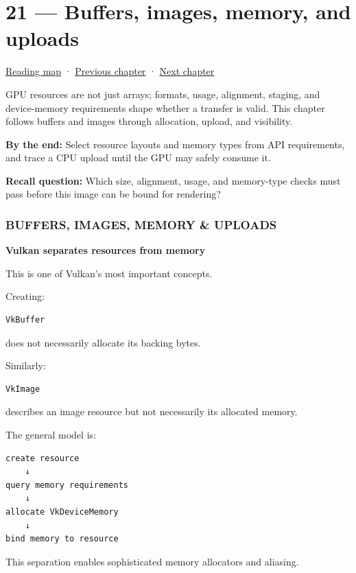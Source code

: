\hypertarget{05-engine-i-ch021}{}
\chapter{21 --- Buffers, images, memory, and uploads}\label{05-engine-i-ch021-buffers-images-memory-and-uploads}

\hyperref[volume-reading-map]{Reading map} · \hyperref[05-engine-i-ch020]{Previous chapter} · \hyperref[05-engine-i-ch022]{Next chapter}

GPU resources are not just arrays; formats, usage, alignment, staging, and device-memory requirements shape whether a transfer is valid. This chapter follows buffers and images through allocation, upload, and visibility.

\textbf{By the end:} Select resource layouts and memory types from API requirements, and trace a CPU upload until the GPU may safely consume it.

\textbf{Recall question:} Which size, alignment, usage, and memory-type checks must pass before this image can be bound for rendering?

\subsection{BUFFERS, IMAGES, MEMORY \& UPLOADS}\label{05-engine-i-ch021-buffers-images-memory-uploads}

\textbf{Vulkan separates resources from memory}

This is one of Vulkan's most important concepts.

Creating:

\begin{verbatim}
VkBuffer
\end{verbatim}

does not necessarily allocate its backing bytes.

Similarly:

\begin{verbatim}
VkImage
\end{verbatim}

describes an image resource but not necessarily its allocated memory.

The general model is:

\begin{verbatim}
create resource
    ↓
query memory requirements
    ↓
allocate VkDeviceMemory
    ↓
bind memory to resource
\end{verbatim}

This separation enables sophisticated memory allocators and aliasing.

